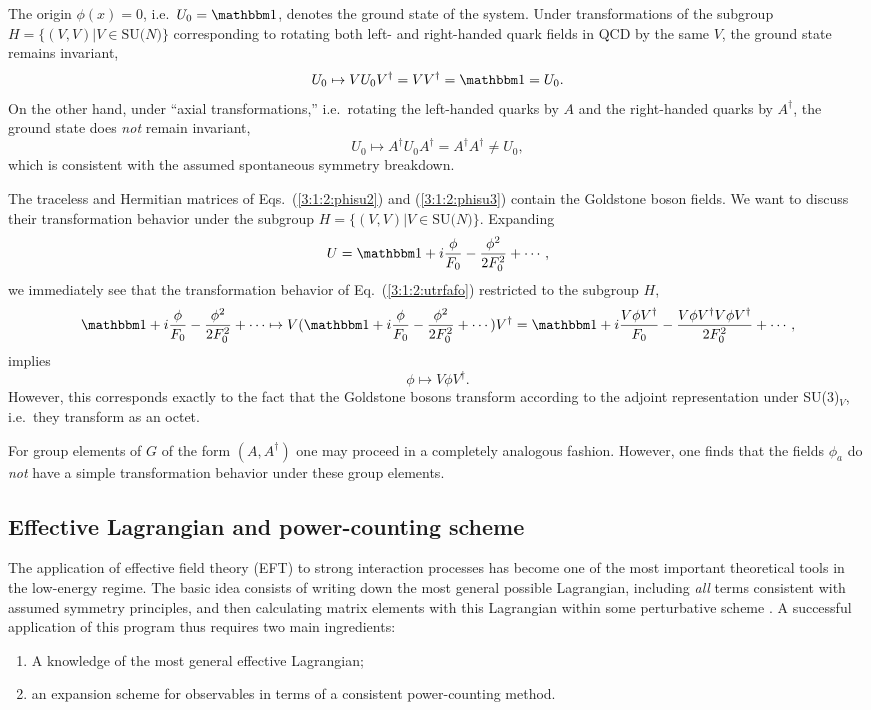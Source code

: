 \documentclass[twoside,12pt]{article}
\begin{document}
   The origin $\phi(x)=0$, i.e.\ $U_0=\mathbbm 1$, denotes the ground state of
the system.
   Under transformations of the subgroup $H=\{(V,V)|V\in \mbox{SU($N$)}\}$
corresponding to rotating both left- and right-handed quark fields in
QCD by the same $V$, the ground state remains invariant,
$$U_0\mapsto VU_0 V^\dagger=V V^\dagger={\mathbbm 1}=U_0.$$
   On the other hand, under ``axial transformations,'' i.e.\ rotating
the left-handed quarks by $A$ and the right-handed quarks by $A^\dagger$,
the ground state does {\em not} remain invariant,
$$U_0\mapsto A^\dagger U_0 A^\dagger=A^\dagger A^\dagger
\neq U_0,$$
   which is consistent with the assumed spontaneous symmetry
breakdown.

   The traceless and Hermitian matrices of Eqs.\ (\ref{3:1:2:phisu2}) and
(\ref{3:1:2:phisu3}) contain the Goldstone boson fields.
   We want to discuss their transformation behavior under
the subgroup $H=\{(V,V)|V\in \mbox{SU($N$)}\}$.
   Expanding
$$U={\mathbbm 1}+i\frac{\phi}{F_0}-\frac{\phi^2}{2F_0^2}+\cdots,$$
we immediately see that the transformation behavior of Eq.\ (\ref{3:1:2:utrfafo})
restricted to the subgroup $H$,
\begin{displaymath}
{\mathbbm 1}+i\frac{\phi}{F_0}-\frac{\phi^2}{2F_0^2}+\cdots\mapsto
V({\mathbbm 1}+i\frac{\phi}{F_0}-\frac{\phi^2}{2F_0^2}+\cdots)V^\dagger
={\mathbbm 1}+i\frac{V \phi V^\dagger}{F_0}-\frac{V\phi V^\dagger V\phi V^\dagger}{2F_0^2}
+\cdots,
\end{displaymath}
implies
\begin{equation}
\label{3:1:2:phihtrafo}
\phi\mapsto V\phi V^\dagger.
\end{equation}
   However, this corresponds exactly to the fact that the Goldstone
   bosons transform according to the adjoint representation under SU(3)$_V$,
   i.e.~they transform as an octet.

   For group elements of $G$ of the form $(A,A^\dagger)$ one may
proceed in a completely analogous fashion.
   However, one finds that the fields $\phi_a$ do {\em not} have
a simple transformation behavior under these group elements.


\subsection{Effective Lagrangian and power-counting scheme}
   The application of effective field theory (EFT) to strong interaction
processes has become one of the most important theoretical tools
in the low-energy regime.
   The basic idea consists of writing down the most general possible
Lagrangian, including {\em all} terms consistent with assumed symmetry
principles, and then calculating matrix elements with this Lagrangian
within some perturbative scheme \cite{Weinberg:1978kz}.
   A successful application of this program thus requires two main ingredients:
\begin{enumerate}
\item[(1)]
A knowledge of the most general effective Lagrangian;
\item[(2)]
an expansion scheme for observables in terms of a consistent power-counting
method.
\end{enumerate}
\end{document}
